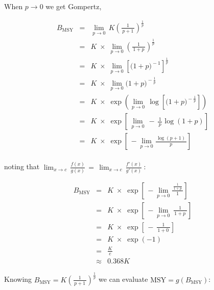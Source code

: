 \documentclass[fleqn]{article}
\newcommand{\MSY}{\mathrm{MSY}}
\newcommand{\msy}{_\mathrm{MSY}}
\begin{document}
\newpage

When $p\!\to\!0$ we get Gompertz,

\begin{eqnarray*}
  B\msy &=& \lim_{p\to 0}\,K\!
  \left(\!\frac{1}{\,p\!+\!1\,}\!\right)^{\!\frac{1}{p}}              \\[1em]
  ~     &=& K \;\times\; \lim_{p\to 0}
  \left(\!\frac{1}{\,1\!+\!p\,}\!\right)^{\!\frac{1}{p}}              \\[1em]
  ~     &=& K \;\times\; \lim_{p\to 0}
  \left[\Big(1\!+\!p\Big)^{\!-1}\right]^{\frac{1}{p}}                 \\[1em]
  ~     &=& K \;\times\;
  \lim_{p\to 0}\Big(1\!+\!p\Big)^{\!-\frac{1}{p}}\\[1em]
  ~     &=& K \;\times\; \exp\!\left(\lim_{p\to 0}\,
    \log\!\left[\Big(1\!+\!p\Big)^{\!-\frac{1}{p}}\right]\right)      \\[1em]
  ~     &=& K \;\times\; \exp\!
  \left[\,\lim_{p\to 0}\,-\,\frac{1}{\,p\,}\log(1\!+\!p)\right]       \\[1em]
  ~     &=& K \;\times\; \exp\!
  \left[\,-\lim_{p\to 0}\frac{\,\log(p\!+\!1)\,}{p}\right]            \\[1ex]
\end{eqnarray*}

noting that $\displaystyle\lim_{x\to
  c}\,\frac{f(x)}{g(x)}\,=\,\displaystyle\lim_{x\to c}\,\frac{f'(x)}{g'(x)}\:$:

\begin{eqnarray*}
  B\msy &=&       K \;\times\;
  \exp\!\left[\,-\lim_{p\to 0}\frac{\,\frac{1}{1+p}\,}{1}\right]\\[1em]
  ~     &=&       K \;\times\;
  \exp\!\left[\,-\lim_{p\to 0}\,\frac{1}{\,1\!+\!p\;}\right]    \\[1em]
  ~     &=&       K \;\times\;
  \exp\!\left[\,-\,\frac{1}{\,1\!+\!0\;}\right]                 \\[1em]
  ~     &=&       K \;\times\; \exp(-1)                         \\[1em]
  ~     &=&       \frac{K}{e}                                   \\[1em]
  ~     &\approx& 0.368K
\end{eqnarray*}

\newpage

Knowing $B\msy=K\!\left(\!\frac{1}{\,p+1\,}\!\right)^{\!\frac{1}{p}}$ we can
evaluate $\MSY\!=\!g(B\msy)$:
\end{document}
